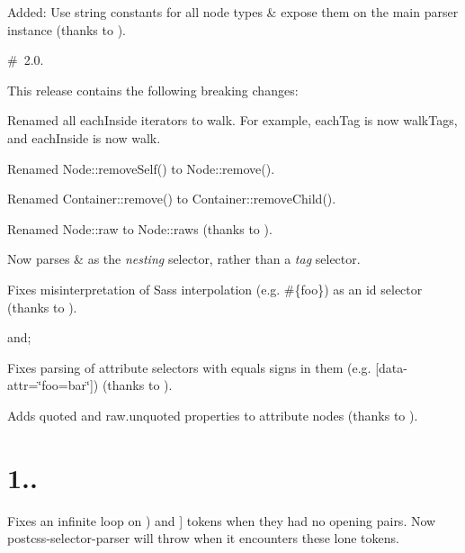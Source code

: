 \begin{DoxyItemize}
\item Added\+: Use string constants for all node types \& expose them on the main parser instance (thanks to ).
\end{DoxyItemize}

\# 2.0.

This release contains the following breaking changes\+:


\begin{DoxyItemize}
\item Renamed all {\ttfamily each\+Inside} iterators to {\ttfamily walk}. For example, {\ttfamily each\+Tag} is now {\ttfamily walk\+Tags}, and {\ttfamily each\+Inside} is now {\ttfamily walk}.
\item Renamed {\ttfamily Node\+::remove\+Self()} to {\ttfamily Node\+::remove()}.
\item Renamed {\ttfamily Container\+::remove()} to {\ttfamily Container\+::remove\+Child()}.
\item Renamed {\ttfamily Node\+::raw} to {\ttfamily Node\+::raws} (thanks to ).
\item Now parses {\ttfamily \&} as the {\itshape nesting} selector, rather than a {\itshape tag} selector.
\item Fixes misinterpretation of Sass interpolation (e.\+g. {\ttfamily \#\{foo\}}) as an id selector (thanks to ).
\end{DoxyItemize}

and;


\begin{DoxyItemize}
\item Fixes parsing of attribute selectors with equals signs in them (e.\+g. {\ttfamily \mbox{[}data-\/attr=\char`\"{}foo=bar\char`\"{}\mbox{]}}) (thanks to ).
\item Adds {\ttfamily quoted} and {\ttfamily raw.\+unquoted} properties to attribute nodes (thanks to ).
\end{DoxyItemize}

\section*{1..}


\begin{DoxyItemize}
\item Fixes an infinite loop on {\ttfamily )} and {\ttfamily \mbox{]}} tokens when they had no opening pairs. Now postcss-\/selector-\/parser will throw when it encounters these lone tokens.
\end{DoxyItemize}

